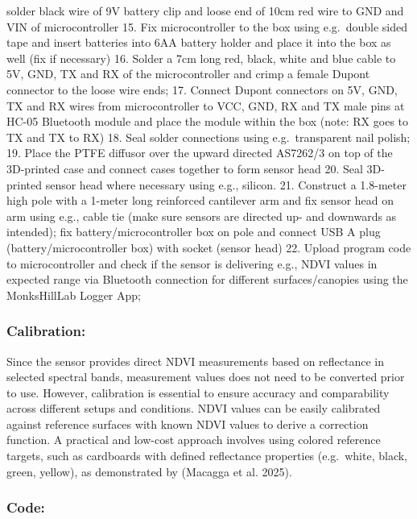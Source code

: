 \documentclass[
  11pt,
  letterpaper,
]{book}
\begin{document}
solder black wire of 9V battery clip and loose end of 10cm red wire to
GND and VIN of microcontroller 15. Fix microcontroller to the box using
e.g.~double sided tape and insert batteries into 6AA battery holder and
place it into the box as well (fix if necessary) 16. Solder a 7cm long
red, black, white and blue cable to 5V, GND, TX and RX of the
microcontroller and crimp a female Dupont connector to the loose wire
ends; 17. Connect Dupont connectors on 5V, GND, TX and RX wires from
microcontroller to VCC, GND, RX and TX male pins at HC-05 Bluetooth
module and place the module within the box (note: RX goes to TX and TX
to RX) 18. Seal solder connections using e.g.~transparent nail polish;
19. Place the PTFE diffusor over the upward directed AS7262/3 on top of
the 3D-printed case and connect cases together to form sensor head 20.
Seal 3D-printed sensor head where necessary using e.g., silicon. 21.
Construct a 1.8-meter high pole with a 1-meter long reinforced
cantilever arm and fix sensor head on arm using e.g., cable tie (make
sure sensors are directed up- and downwards as intended); fix
battery/microcontroller box on pole and connect USB A plug
(battery/microcontroller box) with socket (sensor head) 22. Upload
program code to microcontroller and check if the sensor is delivering
e.g., NDVI values in expected range via Bluetooth connection for
different surfaces/canopies using the MonksHillLab Logger App;

\subsubsection{Calibration:}\label{sec-handheld-spectral-calibration}

Since the sensor provides direct NDVI measurements based on reflectance
in selected spectral bands, measurement values does not need to be
converted prior to use. However, calibration is essential to ensure
accuracy and comparability across different setups and conditions. NDVI
values can be easily calibrated against reference surfaces with known
NDVI values to derive a correction function. A practical and low-cost
approach involves using colored reference targets, such as cardboards
with defined reflectance properties (e.g.~white, black, green, yellow),
as demonstrated by (Macagga et al. 2025).

\subsubsection{Code:}\label{sec-handheld-spectral-code}
\end{document}

